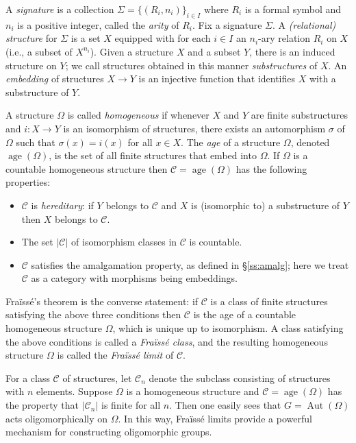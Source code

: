 \documentclass[12pt]{amsart}
\numberwithin{equation}{section}
\theoremstyle{definition}
\newcommand{\cC}{\mathcal{C}}
\newcommand{\defn}[1]{\emph{#1}}
\DeclareMathOperator{\Aut}{Aut}
\DeclareMathOperator{\age}{age}
\begin{document}
A \defn{signature} is a collection $\Sigma=\{(R_i,n_i)\}_{i \in I}$ where $R_i$ is a formal symbol and $n_i$ is a positive integer, called the \defn{arity} of $R_i$. Fix a signature $\Sigma$. A \defn{(relational) structure} for $\Sigma$ is a set $X$ equipped with for each $i \in I$ an $n_i$-ary relation $R_i$ on $X$ (i.e., a subset of $X^{n_i}$). Given a structure $X$ and a subset $Y$, there is an induced structure on $Y$; we call structures obtained in this manner \defn{substructures} of $X$. An \defn{embedding} of structures $X \to Y$ is an injective function that identifies $X$ with a substructure of $Y$.

A structure $\Omega$ is called \defn{homogeneous} if whenever $X$ and $Y$ are finite substructures and $i \colon X \to Y$ is an isomorphism of structures, there exists an automorphism $\sigma$ of $\Omega$ such that $\sigma(x)=i(x)$ for all $x \in X$. The \defn{age} of a structure $\Omega$, denoted $\age(\Omega)$, is the set of all finite structures that embed into $\Omega$. If $\Omega$ is a countable homogeneous structure then $\cC=\age(\Omega)$ has the following properties:
\begin{itemize}
\item $\cC$ is \defn{hereditary}: if $Y$ belongs to $\cC$ and $X$ is (isomorphic to) a substructure of $Y$ then $X$ belongs to $\cC$.
\item The set $\vert \cC \vert$ of isomorphism classes in $\cC$ is countable.
\item $\cC$ satisfies the amalgamation property, as defined in \S \ref{ss:amalg}; here we treat $\cC$ as a category with morphisms being embeddings.
\end{itemize}
Fra\"iss\'e's theorem is the converse statement: if $\cC$ is a class of finite structures satisfying the above three conditions then $\cC$ is the age of a countable homogeneous structure $\Omega$, which is unique up to isomorphism. A class satisfying the above conditions is called a \defn{Fra\"iss\'e class}, and the resulting homogeneous structure $\Omega$ is called the \defn{Fra\"iss\'e limit} of $\cC$.

For a class $\cC$ of structures, let $\cC_n$ denote the subclass consisting of structures with $n$ elements. Suppose $\Omega$ is a homogeneous structure and $\cC=\age(\Omega)$ has the property that $\vert \cC_n \vert$ is finite for all $n$. Then one easily sees that $G=\Aut(\Omega)$ acts oligomorphically on $\Omega$. In this way, Fra\"iss\'e limits provide a powerful mechanism for constructing oligomorphic groups.
\end{document}
